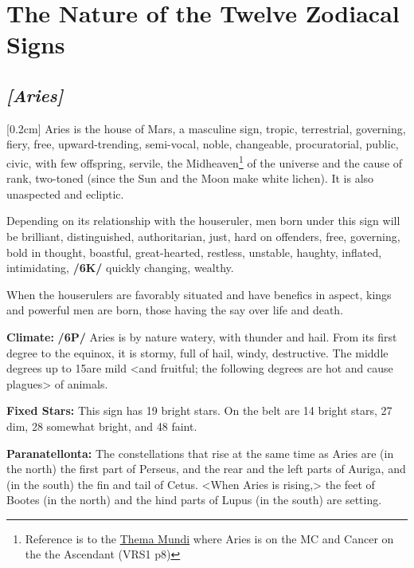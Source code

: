 
\section{The Nature of the Twelve Zodiacal Signs}
\subsection{\textit{[Aries]}}
[0.2cm]
 Aries is the house of Mars, a  masculine sign,  tropic,  terrestrial, governing,  fiery, free, upward-trending,  semi-vocal, noble, changeable, procuratorial, public, civic, with few offspring,  servile, the Midheaven\footnote{Reference is to the \href{http://planetwavesweekly.com/dadatemp/1832374392.html}{Thema Mundi} where Aries is on the MC and Cancer on the the Ascendant (VRS1 p8)} of the universe and the cause of rank, two-toned (since the Sun and the Moon make white lichen). It is also unaspected and ecliptic. 

\mndl[0.2cm]
Depending on its relationship with the houseruler, men born under this sign will be brilliant, distinguished, authoritarian, just, hard on offenders, free, governing, bold in thought, boastful, great-hearted, restless, unstable, haughty, inflated, intimidating, \textbf{/6K/} quickly changing, wealthy. 

\mndl[0.2cm]
When the houserulers are favorably situated and have benefics in aspect, kings and powerful men are born, those
having the say over life and death.

\textbf{Climate:} \textbf{/6P/} Aries is by nature watery, with thunder and hail. From its first degree to the equinox, it is stormy, full of hail, windy, destructive. The middle degrees up to 15\deg are mild <and fruitful; the following degrees are hot and cause plagues> of animals. 

\textbf{Fixed Stars:} This sign has 19 bright stars. On the belt are 14 bright stars, 27 dim, 28 somewhat bright, and 48 faint. 

\textbf{Paranatellonta:} The constellations that rise at the same time as Aries are (in the north) the first part of Perseus, and the rear and the left parts of Auriga, and (in the south) the fin and
tail of Cetus. <When Aries is rising,> the feet of Bootes (in the north) and the hind parts of Lupus (in the south) are setting.

